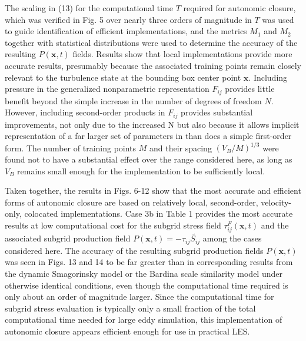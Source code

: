 The scaling in (13) for the computational time $T$ required for autonomic closure, which was verified in Fig. 5 over nearly three orders of magnitude in $T$ was used to guide identification of efficient implementations, and the metrics $M_1$  and $M_2$  together with statistical distributions were used to determine the accuracy of the resulting $P(\mathbf{x},t)$  fields. Results show that local implementations provide more accurate results, presumably because the associated training points remain closely relevant to the turbulence state at the bounding box center point $\mathbf{x}$. Including pressure in the generalized nonparametric representation  $F_{ij}$ provides little benefit beyond the simple increase in the number of degrees of freedom $N$. However, including second-order products in $F_{ij}$  provides substantial improvements, not only due to the increased N but also because it allows implicit representation of a far larger set of parameters in   than does a simple first-order form. The number of training points $M$ and their spacing $(V_B/M)^{1/3}$ were found not to have a substantial effect over the range considered here, as long as $V_B$  remains small enough for the implementation to be sufficiently local.

Taken together, the results in Figs. 6-12 show that the most accurate and efficient forms of autonomic closure are based on relatively local, second-order, velocity-only, colocated implementations. Case 3b in Table 1 provides the most accurate results at low computational cost for the subgrid stress field $\tau_{ij}^F(\mathbf{x},t)$  and the associated subgrid production field $P(\mathbf{x},t) = -\tau_{ij}\widetilde{S_{ij}}$  among the cases considered here. The accuracy of the resulting subgrid production fields  $P(\mathbf{x},t)$ was seen in Figs. 13 and 14 to be far greater than in corresponding results from the dynamic Smagorinsky model or the Bardina scale similarity model under otherwise identical conditions, even though the computational time required is only about an order of magnitude larger. Since the computational time for subgrid stress evaluation is typically only a small fraction of the total computational time needed for large eddy simulation, this implementation of autonomic closure appears efficient enough for use in practical LES.

